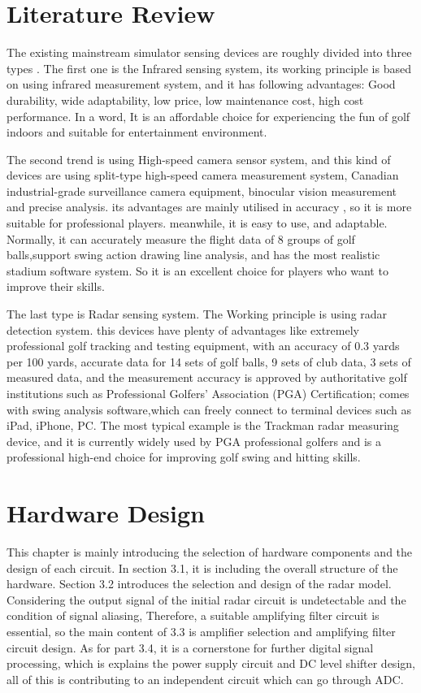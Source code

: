 \newpage
\section{Literature Review}
The existing mainstream simulator sensing devices are roughly divided into three types \textcite{tuxen2020method}.
The first one is the Infrared sensing system, its working principle is based on using infrared measurement system, and it has following advantages: Good durability, wide adaptability, low price, low maintenance cost, high cost performance. In a word, It is an affordable choice for experiencing the fun of golf indoors and suitable for entertainment environment.

The second trend is using High-speed camera sensor system, and this kind of devices are using split-type high-speed camera measurement system, Canadian industrial-grade surveillance camera equipment, binocular vision measurement and precise analysis.
its advantages are mainly utilised in accuracy , so it is more suitable for professional players. meanwhile, it is easy to use, and adaptable. Normally, it can accurately measure the flight data of 8 groups of golf balls,support swing action drawing line analysis, and has the most realistic stadium software system. So it is an excellent choice for players who want to improve their skills.

The last type is Radar sensing system.  The Working principle is  using radar detection system.
this devices have plenty of advantages like extremely professional golf tracking and testing equipment, \textcite{trackmangolf} with an accuracy of 0.3 yards per 100 yards, accurate data for 14 sets of golf balls, 9 sets of club data, 3 sets of measured data, and the measurement accuracy is approved by authoritative golf institutions such as Professional Golfers' Association (PGA) Certification; comes with swing analysis software,which can freely connect to terminal devices such as iPad, iPhone, PC. The most typical example is the Trackman radar measuring device, and it is currently widely used by PGA professional golfers and is a professional high-end choice for improving golf swing and hitting skills.





\newpage
\section{Hardware Design}
This chapter is mainly introducing the selection of hardware components and the design of each circuit. In section 3.1, it is including the overall structure of the hardware. Section 3.2 introduces the selection and design of the radar model. Considering the output signal of the initial radar circuit is undetectable and the condition of signal aliasing, Therefore, a suitable amplifying filter circuit is essential, so the main content of 3.3 is amplifier selection and amplifying filter circuit design. As for part 3.4, it is a cornerstone for further digital signal processing, which is explains the power supply circuit and DC level shifter design, all of this is contributing to an independent circuit which can go through ADC.
